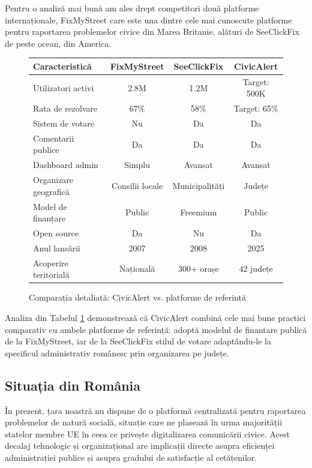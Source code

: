 \documentclass[12pt,a4paper]{report}
\begin{document}
Pentru o analiză mai bună am ales drept competitori două platforme internaționale, FixMyStreet care este una dintre cele mai cunoscute platforme pentru raportarea problemelor civice din Marea Britanie, alături de SeeClickFix de peste ocean, din America.

\begin{figure}[H]
\centering
\begin{tabular}{|l|c|c|c|}
\hline
\textbf{Caracteristică} & \textbf{FixMyStreet} & \textbf{SeeClickFix} & \textbf{CivicAlert} \\
\hline
Utilizatori activi & 2.8M & 1.2M & Target: 500K \\
\hline
Rata de rezolvare & 67\% & 58\% & Target: 65\% \\
\hline
Sistem de votare & Nu & Da & Da \\
\hline
Comentarii publice & Da & Da & Da \\
\hline
Dashboard admin & Simplu & Avansat & Avansat \\
\hline
Organizare geografică & Consilii locale & Municipalități & Județe \\
\hline
Model de finanțare & Public & Freemium & Public \\
\hline
Open source & Da & Nu & Da \\
\hline
Anul lansării & 2007 & 2008 & 2025 \\
\hline
Acoperire teritorială & Națională & 300+ orașe & 42 județe \\
\hline
\end{tabular}
\caption{Comparația detaliată: CivicAlert vs. platforme de referință}
\label{tab:comparatie_detaliata}
\end{figure}

Analiza din Tabelul \ref{tab:comparatie_detaliata} demonstrează că CivicAlert combină cele mai bune practici comparativ cu  ambele platforme de referință: adoptă modelul de finantare publică de la FixMyStreet, iar  de la SeeClickFix stilul de votare  adaptându-le la specificul administrativ românesc prin organizarea pe județe.

\subsection{Situația din România}

În prezent, țara noastră nu dispune de o platformă centralizată pentru raportarea problemelor de natură socială, situație care ne plasează  în urma majorității statelor membre UE în ceea ce privește digitalizarea comunicării civice. Acest decalaj tehnologic și organizațional are implicații directe asupra eficienței administrației publice și asupra gradului de satisfacție al cetățenilor.
\end{document}
